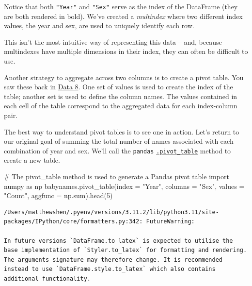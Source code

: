 \documentclass[
  letterpaper,
  DIV=11,
  numbers=noendperiod]{scrreprt}
\newenvironment{Shaded}{\begin{snugshade}}{\end{snugshade}}
\newcommand{\BuiltInTok}[1]{\textcolor[rgb]{0.00,0.23,0.31}{#1}}
\newcommand{\CommentTok}[1]{\textcolor[rgb]{0.37,0.37,0.37}{#1}}
\newcommand{\DecValTok}[1]{\textcolor[rgb]{0.68,0.00,0.00}{#1}}
\newcommand{\ImportTok}[1]{\textcolor[rgb]{0.00,0.46,0.62}{#1}}
\newcommand{\NormalTok}[1]{\textcolor[rgb]{0.00,0.23,0.31}{#1}}
\newcommand{\OperatorTok}[1]{\textcolor[rgb]{0.37,0.37,0.37}{#1}}
\newcommand{\StringTok}[1]{\textcolor[rgb]{0.13,0.47,0.30}{#1}}
\begin{document}
Notice that both \texttt{"Year"} and \texttt{"Sex"} serve as the index
of the DataFrame (they are both rendered in bold). We've created a
\emph{multindex} where two different index values, the year and sex, are
used to uniquely identify each row.

This isn't the most intuitive way of representing this data -- and,
because multindexes have multiple dimensions in their index, they can
often be difficult to use.

Another strategy to aggregate across two columns is to create a pivot
table. You saw these back in
\href{https://inferentialthinking.com/chapters/08/3/Cross-Classifying_by_More_than_One_Variable.html\#pivot-tables-rearranging-the-output-of-group}{Data
8}. One set of values is used to create the index of the table; another
set is used to define the column names. The values contained in each
cell of the table correspond to the aggregated data for each
index-column pair.

The best way to understand pivot tables is to see one in action. Let's
return to our original goal of summing the total number of names
associated with each combination of year and sex. We'll call the
\texttt{pandas}
\href{https://pandas.pydata.org/pandas-docs/stable/reference/api/pandas.pivot_table.html}{\texttt{.pivot\_table}}
method to create a new table.

\begin{Shaded}
\begin{Highlighting}[]
\CommentTok{\# The \textasciigrave{}pivot\_table\textasciigrave{} method is used to generate a Pandas pivot table}
\ImportTok{import}\NormalTok{ numpy }\ImportTok{as}\NormalTok{ np}
\NormalTok{babynames.pivot\_table(index }\OperatorTok{=} \StringTok{"Year"}\NormalTok{, columns }\OperatorTok{=} \StringTok{"Sex"}\NormalTok{, values }\OperatorTok{=} \StringTok{"Count"}\NormalTok{, aggfunc }\OperatorTok{=}\NormalTok{ np.}\BuiltInTok{sum}\NormalTok{).head(}\DecValTok{5}\NormalTok{)}
\end{Highlighting}
\end{Shaded}

\begin{verbatim}
/Users/matthewshen/.pyenv/versions/3.11.2/lib/python3.11/site-packages/IPython/core/formatters.py:342: FutureWarning:

In future versions `DataFrame.to_latex` is expected to utilise the base implementation of `Styler.to_latex` for formatting and rendering. The arguments signature may therefore change. It is recommended instead to use `DataFrame.style.to_latex` which also contains additional functionality.
\end{verbatim}
\end{document}
